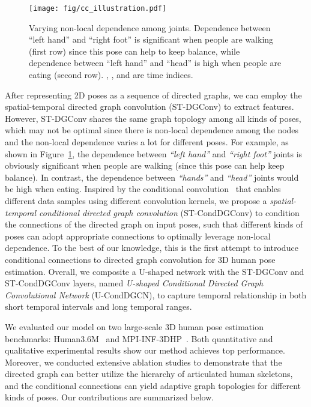 \documentclass[sigconf]{acmart}
\begin{document}
\begin{figure}[!t] 
	\centering
	\texttt{[image: fig/cc\_illustration.pdf]}
	\vspace{-2mm}
	\caption{
		Varying non-local dependence among joints. Dependence between {``left hand''} and {``right foot''} is significant when people are walking (first row) since this pose can help to keep balance, while dependence between {``left hand''} and {``head''} is high when people are eating (second row). , , and  are time indices.
	}
	\vspace{-5mm}
	\label{fig: conditional_connections}
\end{figure} 



After representing 2D poses as a sequence of directed graphs, we can employ the spatial-temporal directed graph convolution (ST-DGConv) to extract features.
However, ST-DGConv shares the same graph topology among all kinds of poses, which may not be optimal since there is non-local dependence among the nodes and the non-local dependence varies a lot for different poses.
For example, as shown in Figure~\ref{fig: conditional_connections}, the dependence between \textit{``left hand''} and \textit{``right foot''} joints is obviously significant when people are walking (since this pose can help keep balance). In contrast, the dependence between \textit{``hands''} and \textit{``head''} joints would be high when eating.
Inspired by the conditional convolution~\cite{NEURIPS2019_f2201f51,tian2020conditional} that enables different data samples using different convolution kernels, we propose a \emph{spatial-temporal conditional directed graph convolution} (ST-CondDGConv) to condition the connections of the directed graph on input poses, such that different kinds of poses can adopt appropriate connections to optimally leverage non-local dependence.
To the best of our knowledge, this is the first attempt to introduce conditional connections to directed graph convolution for 3D human pose estimation.
Overall, we composite a U-shaped network with the ST-DGConv and ST-CondDGConv layers, named \emph{U-shaped Conditional Directed Graph Convolutional Network} (U-CondDGCN), to capture temporal relationship in both short temporal intervals and long temporal ranges. 



We evaluated our model on two large-scale 3D human pose estimation benchmarks: Human3.6M~\cite{ionescu2013human3} and MPI-INF-3DHP~\cite{mehta2017monocular}.
Both quantitative and qualitative experimental results show our method achieves top performance.
Moreover, we conducted extensive ablation studies to demonstrate that the directed graph can better utilize the hierarchy of articulated human skeletons, and the conditional connections can yield adaptive graph topologies for different kinds of poses.
Our contributions are summarized below.
\end{document}
